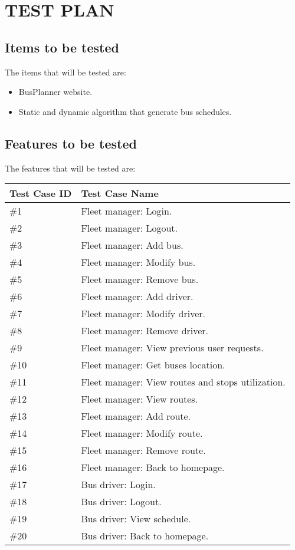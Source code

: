 \section{TEST PLAN}

\subsection{Items to be tested}
The items that will be tested are:
\begin{itemize}
	\item BusPlanner website.
	\item Static and dynamic algorithm that generate bus schedules.
\end{itemize}

\subsection{Features to be tested}
The features that will be tested are:
\begin{center}
	\begin{tabular} { | m{3cm} | m{10cm} | }
		\hline
		\textbf{Test Case ID} & \textbf{Test Case Name}\\
		\hline
		\#1 & Fleet manager: Login.\\
		\hline
		\#2 & Fleet manager: Logout.\\
		\hline
		\#3 & Fleet manager: Add bus.\\
		\hline
		\#4 & Fleet manager: Modify bus.\\
		\hline
		\#5 & Fleet manager: Remove bus.\\
		\hline
		\#6 & Fleet manager: Add driver.\\
		\hline
		\#7 & Fleet manager: Modify driver.\\
		\hline
		\#8 & Fleet manager: Remove driver.\\
		\hline
		\#9 & Fleet manager: View previous user requests.\\
		\hline
		\#10 & Fleet manager: Get buses location.\\
		\hline
		\#11 & Fleet manager: View routes and stops utilization.\\
		\hline
		\#12 & Fleet manager: View routes.\\
		\hline
		\#13 & Fleet manager: Add route.\\
		\hline
		\#14 & Fleet manager: Modify route.\\
		\hline
		\#15 & Fleet manager: Remove route.\\
		\hline
		\#16 & Fleet manager: Back to homepage.\\
		\hline
		\#17 & Bus driver: Login.\\
		\hline
		\#18 & Bus driver: Logout.\\
		\hline
		\#19 & Bus driver: View schedule.\\
		\hline
		\#20 & Bus driver: Back to homepage.\\
		\hline
	\end{tabular}
\end{center}
\newpage
